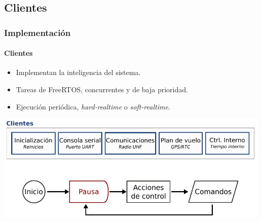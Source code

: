 \documentclass[xcolor=dvipsnames]{beamer}
\begin{document}
    \subsection{Clientes}
    \begin{frame}
        \frametitle{Implementación}
        \framesubtitle{Clientes}

        \begin{itemize}
            \item Implementan la inteligencia del sistema.
            \item Tareas de FreeRTOS, concurrentes y de baja prioridad.
            \item Ejecución periódica, \textit{hard-realtime} o \textit{soft-realtime}.
        \end{itemize}
        
        \begin{center}
            \includegraphics[width=0.99\textwidth]{img/implementacion_clientes.pdf}
        \end{center}
        
    \end{frame}
    
\end{document}
